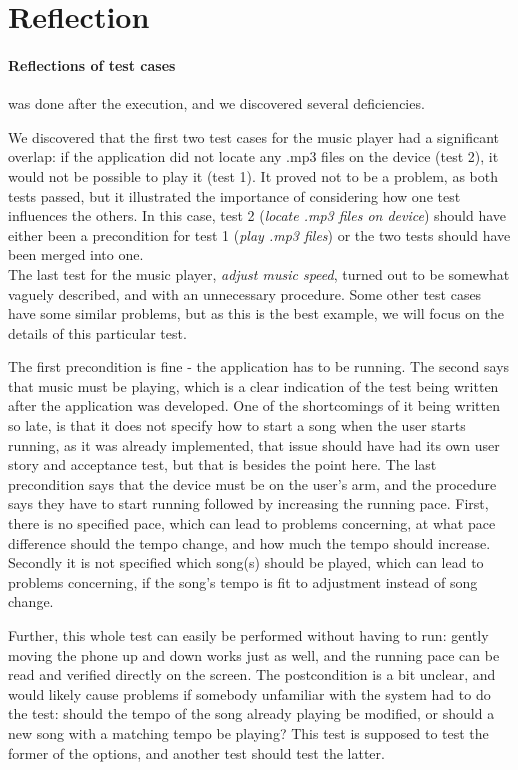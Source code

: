 \section{Reflection}
\paragraph{Reflections of test cases} was done after the execution, and we discovered several deficiencies.

We discovered that the first two test cases for the music player had a significant overlap: if the application did not locate any .mp3 files on the device (test 2), it would not be possible to play it (test 1).
It proved not to be a problem, as both tests passed, but it illustrated the importance of considering how one test influences the others.
In this case, test 2 (\textit{locate .mp3 files on device}) should have either been a precondition for test 1 (\textit{play .mp3 files}) or the two tests should have been merged into one.\\

The last test for the music player, \textit{adjust music speed}, turned out to be somewhat vaguely described, and with an unnecessary procedure.
Some other test cases have some similar problems, but as this is the best example, we will focus on the details of this particular test.

The first precondition is fine - the application has to be running.
The second says that music must be playing, which is a clear indication of the test being written after the application was developed.
One of the shortcomings of it being written so late, is that it does not specify how to start a song when the user starts running, as it was already implemented, that issue should have had its own user story and acceptance test, but that is besides the point here.
The last precondition says that the device must be on the user's arm, and the procedure says they have to start running followed by increasing the running pace.
First, there is no specified pace, which can lead to problems concerning, at what pace difference should the tempo change, and how much the tempo should increase. 
Secondly it is not specified which song(s) should be played, which can lead to problems concerning, if the song's tempo is fit to adjustment instead of song change.

Further, this whole test can easily be performed without having to run: gently moving the phone up and down works just as well, and the running pace can be read and verified directly on the screen.
The postcondition is a bit unclear, and would likely cause problems if somebody unfamiliar with the system had to do the test: should the tempo of the song already playing be modified, or should a new song with a matching tempo be playing? 
This test is supposed to test the former of the options, and another test should test the latter.

